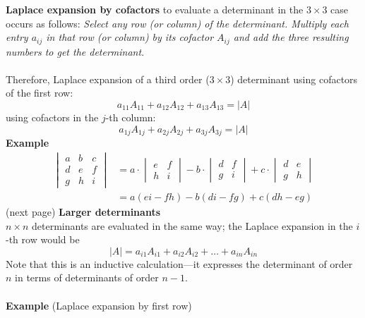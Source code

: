 \documentclass{report}
\begin{document}
\textbf{Laplace expansion by cofactors} to evaluate a determinant in the $3\times3$ case occurs as follows: 
\textit{Select any row (or column) of the determinant. Multiply each entry $a_{ij}$ in that row (or column)
by its cofactor $A_{ij}$ and add the three resulting numbers to get the determinant}.\\
\vspace{1mm}\\
Therefore, Laplace expansion of a third order ($3\times3$) determinant using cofactors of the first row:
\begin{equation*}
a_{11}A_{11}+a_{12}A_{12}+a_{13}A_{13}=|A|
\end{equation*}
using cofactors in the $j$-th column:
\begin{equation*}
a_{1j}A_{1j}+a_{2j}A_{2j}+a_{3j}A_{3j}=|A|
\end{equation*}
\textbf{Example}
\begin{align*}
\begin{vmatrix}
a & b & c\\
d & e & f\\
g & h & i
\end{vmatrix}
&=a\cdot
\begin{vmatrix}
e & f\\
h & i
\end{vmatrix}
-b\cdot
\begin{vmatrix}
d & f\\
g & i
\end{vmatrix}
+c\cdot
\begin{vmatrix}
d & e\\
g & h
\end{vmatrix}\\
&=a(ei-fh)-b(di-fg)+c(dh-eg)
\end{align*}
(next page)
\newpage
\noindent\textbf{Larger determinants}\\
$n\times n$ determinants are evaluated in the same way; the Laplace expansion
in the $i$-th row would be
\begin{equation*}
|A|=a_{i1}A_{i1}+a_{i2}A_{i2}+\ldots+a_{in}A_{in}
\end{equation*}
Note that this is an inductive calculation---it expresses the determinant of order 
$n$ in terms of determinants of order $n-1$.\\
\vspace{1mm}\\
\textbf{Example} (Laplace expansion by first row)
\end{document}
